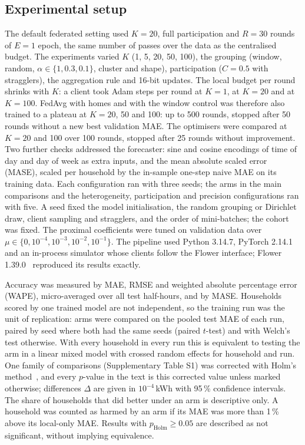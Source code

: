 \subsection{Experimental setup}
The default federated setting used $K=20$, full participation and $R=30$ rounds of $E=1$ epoch, the same number of
passes over the data as the centralised budget. The experiments varied $K$ (1, 5, 20, 50, 100), the grouping (window,
random, $\alpha\in\{1,0.3,0.1\}$, cluster and shape), participation ($C=0.5$ with stragglers), the aggregation rule and
16-bit updates. The local budget per round shrinks with $K$: a client took \RvStepsKone{} Adam steps per round at $K=1$,
\RvStepsKtwenty{} at $K=20$ and \RvStepsKhundred{} at $K=100$. FedAvg with homes and with the window control was
therefore also trained to a plateau at $K=20$, 50 and 100: up to 500 rounds, stopped after 50 rounds without a new best
validation MAE. The optimisers were compared at $K=20$ and 100 over 100 rounds, stopped after 25 rounds without
improvement. Two further checks addressed the forecaster:
sine and cosine encodings of time of day and day of week as extra inputs, and the mean absolute scaled error (MASE),
scaled per household by the in-sample one-step naive MAE on its training data. Each configuration ran with three seeds;
the arms in the main comparisons and the heterogeneity, participation and precision configurations ran with five. A seed fixed the model initialisation, the
random grouping or Dirichlet draw, client sampling and stragglers, and the order of mini-batches; the cohort was fixed.
The proximal coefficients were tuned on validation data over $\mu\in\{0,10^{-4},10^{-3},10^{-2},10^{-1}\}$.
The pipeline used Python 3.14.7, PyTorch 2.14.1 and an in-process simulator whose clients follow the Flower interface;
Flower 1.39.0~\cite{beutel2020flower} reproduced its results exactly.

Accuracy was measured by MAE, RMSE and weighted absolute percentage error (WAPE), micro-averaged over all test
half-hours, and by MASE. Households scored by one trained model are not independent, so the training run was the unit
of replication: arms were compared on the pooled test MAE of each run, paired by seed where both had the same seeds
(paired $t$-test) and with Welch's test otherwise. With every household in every run this is equivalent to testing the
arm in a linear mixed model with crossed random effects for household and run. One family of \RvTsFamily{} comparisons
(Supplementary Table S1) was corrected with Holm's method~\cite{holm1979}, and every $p$-value in the text is this
corrected value unless marked otherwise; differences $\Delta$ are given in $10^{-4}$\,kWh with 95\,\% confidence
intervals. The share of households that did better under an arm is descriptive only. A household was counted as harmed
by an arm if its MAE was more than 1\,\% above its local-only MAE. Results with $p_{\mathrm{Holm}}\ge0.05$ are described
as not significant, without implying equivalence.

